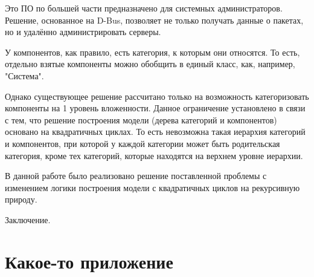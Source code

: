 \documentclass[bachelor, och, pract]{SCWorks}
\begin{document}
Это ПО по большей части предназначено для системных администраторов.
Решение, основанное на D-Bus, позволяет не только получать данные о пакетах, но и удалённо администрировать серверы.

У компонентов, как правило, есть категория, к которым они относятся.
То есть, отдельно взятые компоненты можно обобщить в единый класс, как, например, "Система".

Однако существующее решение рассчитано только на возможность категоризовать компоненты на 1 уровень вложенности.
Данное ограничение установлено в связи с тем, что решение построения модели (дерева категорий и компонентов) основано на квадратичных циклах.
То есть невозможна такая иерархия категорий и компонентов, при которой у каждой категории может быть родительская категория, кроме тех категорий, которые находятся на верхнем уровне иерархии.

В данной работе было реализовано решение поставленной проблемы с изменением логики построения модели с квадратичных циклов на рекурсивную природу.


\newpage

\conclusion
Заключение.

%

%



\appendix

\section{Какое-то приложение}
\end{document}
